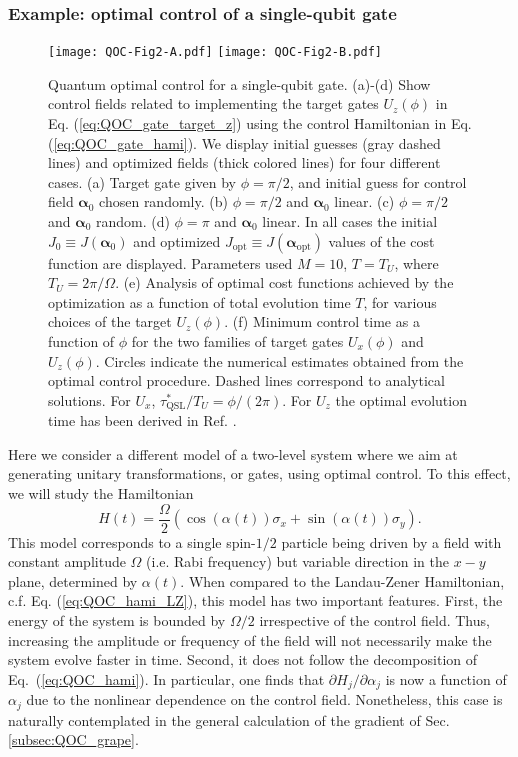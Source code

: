 \subsubsection{Example: optimal control of a single-qubit gate}
\label{subsec:QOC_example_gate}
\begin{figure}[t]
\texttt{[image: QOC-Fig2-A.pdf]}
\texttt{[image: QOC-Fig2-B.pdf]}
\caption{Quantum optimal control for a single-qubit gate. (a)-(d) Show control fields related to implementing the target gates $U_z(\phi)$ in Eq. (\ref{eq:QOC_gate_target_z}) using the control Hamiltonian in Eq. (\ref{eq:QOC_gate_hami}). We display
initial guesses (gray dashed lines) and optimized fields (thick colored lines) for four different cases. (a) Target gate given by $\phi=\pi/2$, and initial guess for control field $\bm{\alpha}_0$ chosen randomly. (b) $\phi=\pi/2$ and $\bm{\alpha}_0$ linear. (c) $\phi=\pi/2$ and $\bm{\alpha}_0$ random. (d) $\phi=\pi$ and $\bm{\alpha}_0$ linear. In all cases the initial $J_0\equiv J({\bm{\alpha}_0})$ and optimized $J_{\mathrm{opt}}\equiv J(\bm{\alpha}_{\mathrm{opt}})$ values of the cost function are displayed. Parameters used $M=10$, $T=T_U$, where $T_U=2\pi/\Omega$. (e) Analysis of optimal cost functions achieved by the optimization as a function of total evolution time $T$, for various choices of the target $U_z(\phi)$.
(f) Minimum control time as a function of $\phi$ for the two families of target gates $U_x(\phi)$ and $U_z(\phi)$. Circles indicate the numerical estimates obtained from the optimal control procedure. Dashed lines correspond to analytical solutions. For $U_x$, $\tau_{\mathrm{QSL}}^\ast/T_U=\phi/(2\pi)$. For $U_z$ the optimal evolution time has been derived in Ref. \cite{boozer2012}.}
\label{fig:QOC2}
\end{figure}



Here we consider a different model of a two-level system where we aim at generating unitary transformations, or gates, using optimal control. To this effect, we will study the Hamiltonian
\begin{equation}
    H(t) = \frac{\Omega}{2}\left( \cos(\alpha(t)) \sigma_x + \sin(\alpha(t)) \sigma_y\right).
    \label{eq:QOC_gate_hami}
\end{equation}
This model corresponds to a single spin-$1/2$ particle being driven by a field with constant amplitude $\Omega$ (i.e. Rabi frequency) but variable direction in the $x\!-\!y$ plane, determined by $\alpha(t)$. When compared to the Landau-Zener Hamiltonian, c.f. Eq. (\ref{eq:QOC_hami_LZ}), this model has two important features. First, the energy of the system is bounded by $\Omega/2$ irrespective of the control field. Thus, increasing the amplitude or frequency of the field will not necessarily make the system evolve faster in time. Second, it does not follow the decomposition of Eq.~(\ref{eq:QOC_hami}). In particular, one finds that $\partial H_j/\partial \alpha_j$ is now a function of $\alpha_j$ due to the nonlinear dependence on the control field. Nonetheless, this case is naturally contemplated in the general calculation of the gradient of Sec. \ref{subsec:QOC_grape}. 

